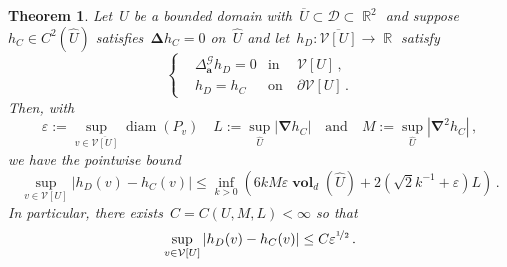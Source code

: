 \documentclass[12pt]{amsart}
\numberwithin{equation}{section}
\DeclareMathOperator{\R}{\mathbb{R}}
\DeclareMathOperator{\diam}{{\mathop{diam}}}
\newtheorem{theorem}{Theorem}[section]
\newcommand{\V}{\mathcal{V}}
\newcommand{\eps}{\varepsilon}
\newcommand{\CLap}{\boldsymbol{\Delta}}
\newcommand{\Cnabla}{\boldsymbol{\nabla}}
\newcommand{\aDelta}{\hyperref[eq:geometric-laplacian]{{\Delta^{\mathcal{G}}_{\cond}}}}
\newcommand{\cond}{\hyperref[eq:geometric-laplacian]{\mathbf{a}}}
\newcommand{\GCU}{\hyperref[eq:graph-closure]{\widehat{U}}}
\DeclareMathOperator{\vol}{\mathbf{vol}}
\begin{document}
\begin{theorem}
	\label{theorem:2d}
	Let~$U$ be a bounded domain with~$\overline{U} \subset \mathcal{D} \subset \R^2$ and suppose~$h_C \in C^{2}(\GCU)$ satisfies~$\CLap h_C = 0$ on~$\GCU$ and let~$h_D: \overline{\V[U]} \to \R$ satisfy 
	\[
	\left\{
	\begin{aligned}
		&  \aDelta h_D = 0 & \mbox{in} & \ \V[U] \,,
		\\
		& h_D = h_C & \mbox{on} & \  \partial \V[U] \, . 
	\end{aligned}
	\right.
	\]
	Then, with
	\[
	\eps := \sup_{v \in \overline{\V[U]}} \diam(P_v) \quad L := \sup_{\GCU} |\Cnabla h_C| \quad \mbox{and} \quad M := \sup_{\GCU} |\Cnabla^2 h_C| \, , 
	\]
	we have the pointwise bound
	\[
	\sup_{v \in \V[U]} | h_D(v) - h_C(v) | \leq \inf_{k >0} \left( 6 k M \eps \vol_{d}(\GCU) + 2 (\sqrt{2} k^{-1} + \eps) L \right) \, .  
	\]
In particular, there exists~$C= C(U, M, L) <\infty$ so that
	\[
	\sup_{v \in \V[U]} | h_D(v) - h_C(v) |\leq  C \eps^{\nicefrac12}  \, . 
	\]
\end{theorem}
\end{document}

